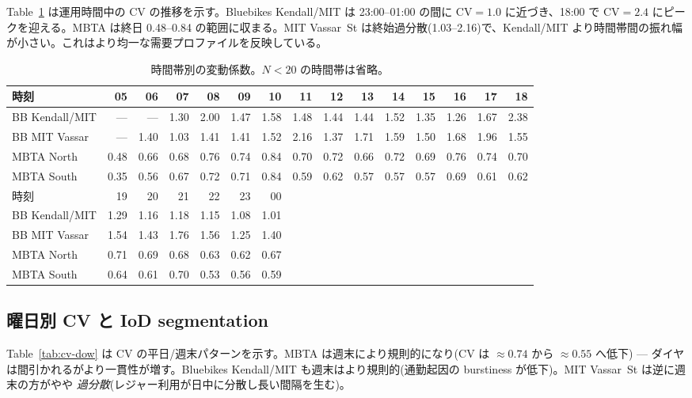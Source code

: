 Table~\ref{tab:cv-hour} は運用時間中の $\mathrm{CV}$ の推移を示す。Bluebikes Kendall/MIT は 23:00--01:00 の間に $\mathrm{CV} = 1.0$ に近づき、18:00 で $\mathrm{CV} = 2.4$ にピークを迎える。MBTA は終日 0.48--0.84 の範囲に収まる。MIT Vassar~St は終始過分散(1.03--2.16)で、Kendall/MIT より時間帯間の振れ幅が小さい。これはより均一な需要プロファイルを反映している。

\begin{table}[h]
\centering
\caption{時間帯別の変動係数。$N < 20$ の時間帯は省略。}
\label{tab:cv-hour}
\footnotesize
\setlength{\tabcolsep}{3pt}
\begin{tabular}{@{}lrrrrrrrrrrrrrr@{}}
\toprule
時刻 & 05 & 06 & 07 & 08 & 09 & 10 & 11 & 12 & 13 & 14 & 15 & 16 & 17 & 18 \\
\midrule
BB Kendall/MIT & --- & --- & 1.30 & 2.00 & 1.47 & 1.58 & 1.48 & 1.44 & 1.44 & 1.52 & 1.35 & 1.26 & 1.67 & 2.38 \\
BB MIT Vassar & --- & 1.40 & 1.03 & 1.41 & 1.41 & 1.52 & 2.16 & 1.37 & 1.71 & 1.59 & 1.50 & 1.68 & 1.96 & 1.55 \\
MBTA North & 0.48 & 0.66 & 0.68 & 0.76 & 0.74 & 0.84 & 0.70 & 0.72 & 0.66 & 0.72 & 0.69 & 0.76 & 0.74 & 0.70 \\
MBTA South & 0.35 & 0.56 & 0.67 & 0.72 & 0.71 & 0.84 & 0.59 & 0.62 & 0.57 & 0.57 & 0.57 & 0.69 & 0.61 & 0.62 \\
\midrule
時刻 & 19 & 20 & 21 & 22 & 23 & 00 & & & & & & & & \\
\midrule
BB Kendall/MIT & 1.29 & 1.16 & 1.18 & 1.15 & 1.08 & 1.01 & & & & & & & & \\
BB MIT Vassar & 1.54 & 1.43 & 1.76 & 1.56 & 1.25 & 1.40 & & & & & & & & \\
MBTA North & 0.71 & 0.69 & 0.68 & 0.63 & 0.62 & 0.67 & & & & & & & & \\
MBTA South & 0.64 & 0.61 & 0.70 & 0.53 & 0.56 & 0.59 & & & & & & & & \\
\bottomrule
\end{tabular}
\end{table}

\subsection{曜日別 CV と IoD segmentation}\label{app:dow}

Table~\ref{tab:cv-dow} は $\mathrm{CV}$ の平日/週末パターンを示す。MBTA は週末により規則的になり($\mathrm{CV}$ は $\approx 0.74$ から $\approx 0.55$ へ低下) — ダイヤは間引かれるがより一貫性が増す。Bluebikes Kendall/MIT も週末はより規則的(通勤起因の burstiness が低下)。MIT Vassar~St は逆に週末の方がやや \emph{過分散}(レジャー利用が日中に分散し長い間隔を生む)。

